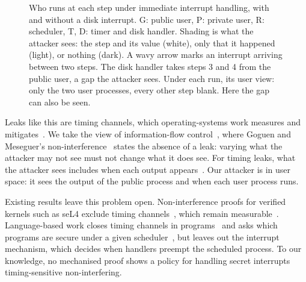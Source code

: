 \begin{figure}[t]
\centering
\caption{Who runs at each step under immediate interrupt handling, with and without a
  disk interrupt. G: public user, P: private user, R: scheduler, T, D: timer
  and disk handler. Shading is what the attacker sees: the step and its value (white),
  only that it happened (light), or nothing (dark). A wavy arrow marks an
  interrupt arriving between two steps. The disk handler takes steps 3 and 4
  from the public user, a gap the attacker sees. Under each run, its
  user view: only the two user processes, every other step blank. Here the gap can also be seen.}
\label{fig:leak}
\end{figure}

Leaks like this are timing channels, which operating-systems work measures and
mitigates~\cite{cock2014,ge2019}. We take the view of information-flow
control~\cite{sabelfeld2003}, where Goguen and Meseguer's
non-interference~\cite{goguen1982} states the absence of a leak: varying what the
attacker may not see must not change what it does see. For timing
leaks, what the attacker sees includes when each output appears~\cite{agat2000}. Our
attacker is in user space: it sees the output of the public process and when each
user process runs.

Existing results leave this problem open. Non-interference proofs for verified
kernels such as seL4 exclude timing channels~\cite{murray2012,murray2013}, which
remain measurable~\cite{cock2014}. Language-based
work closes timing channels in programs~\cite{agat2000,askarov2010} and asks which
programs are secure under a given scheduler~\cite{smith1998,mantel2010}, but leaves out
the interrupt mechanism, which decides when handlers preempt the scheduled process.
To our knowledge, no mechanised proof shows a policy for handling secret interrupts
timing-sensitive non-interfering.

